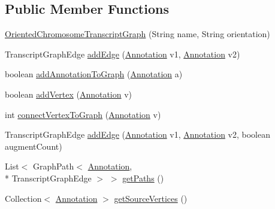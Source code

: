 \subsection*{Public Member Functions}
\begin{DoxyCompactItemize}
\item 
\hyperlink{classumms_1_1core_1_1scripture_1_1_oriented_chromosome_transcript_graph_a25dbca06eccc2ed74c63cd82527e1337}{Oriented\+Chromosome\+Transcript\+Graph} (String name, String orientation)
\item 
Transcript\+Graph\+Edge \hyperlink{classumms_1_1core_1_1scripture_1_1_oriented_chromosome_transcript_graph_aba8a22ce99ff63b98548903d4615ba6b}{add\+Edge} (\hyperlink{interfaceumms_1_1core_1_1annotation_1_1_annotation}{Annotation} v1, \hyperlink{interfaceumms_1_1core_1_1annotation_1_1_annotation}{Annotation} v2)
\item 
boolean \hyperlink{classumms_1_1core_1_1scripture_1_1_oriented_chromosome_transcript_graph_a2d265cc21a1b11e2a089c5d8f2d9a872}{add\+Annotation\+To\+Graph} (\hyperlink{interfaceumms_1_1core_1_1annotation_1_1_annotation}{Annotation} a)
\item 
boolean \hyperlink{classumms_1_1core_1_1scripture_1_1_oriented_chromosome_transcript_graph_a6e0e951bd8fa8e83f453b8050e742b9c}{add\+Vertex} (\hyperlink{interfaceumms_1_1core_1_1annotation_1_1_annotation}{Annotation} v)
\item 
int \hyperlink{classumms_1_1core_1_1scripture_1_1_oriented_chromosome_transcript_graph_a6da3579b3d2cd6a0de92d18839d2cac8}{connect\+Vertex\+To\+Graph} (\hyperlink{interfaceumms_1_1core_1_1annotation_1_1_annotation}{Annotation} v)
\item 
Transcript\+Graph\+Edge \hyperlink{classumms_1_1core_1_1scripture_1_1_oriented_chromosome_transcript_graph_af7151fcd597da49a20437036909bd294}{add\+Edge} (\hyperlink{interfaceumms_1_1core_1_1annotation_1_1_annotation}{Annotation} v1, \hyperlink{interfaceumms_1_1core_1_1annotation_1_1_annotation}{Annotation} v2, boolean augment\+Count)
\item 
List$<$ Graph\+Path$<$ \hyperlink{interfaceumms_1_1core_1_1annotation_1_1_annotation}{Annotation}, \\*
Transcript\+Graph\+Edge $>$ $>$ \hyperlink{classumms_1_1core_1_1scripture_1_1_oriented_chromosome_transcript_graph_a052d51d6c53b23588f9cec5df1af36b8}{get\+Paths} ()
\item 
Collection$<$ \hyperlink{interfaceumms_1_1core_1_1annotation_1_1_annotation}{Annotation} $>$ \hyperlink{classumms_1_1core_1_1scripture_1_1_oriented_chromosome_transcript_graph_a2d2b4ae004f53c19e4890cb3351be976}{get\+Source\+Vertices} ()

\end{DoxyCompactItemize}
